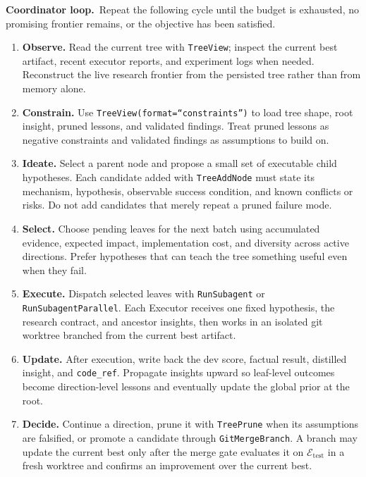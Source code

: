 \documentclass{llmxive}
\providecommand{\Eval}{\mathcal{E}}
\providecommand{\test}{\mathrm{test}}
\begin{document}
\begin{promptbox}[title=\textbf{Coordinator Prompt}]
\smallskip
\noindent\textbf{Coordinator loop.}~Repeat the following cycle until the
budget is exhausted, no promising frontier remains, or the objective has been
satisfied.
\begin{enumerate}[label=\textbf{\arabic*.},leftmargin=1.6em,itemsep=2pt,topsep=2pt]
  \item \textbf{Observe.} Read the current tree with \texttt{TreeView}; inspect
  the current best artifact, recent executor reports, and experiment logs when
  needed. Reconstruct the live research frontier from the persisted tree rather
  than from memory alone.
  \item \textbf{Constrain.} Use \texttt{TreeView(format=``constraints'')} to
  load tree shape, root insight, pruned lessons, and validated findings. Treat
  pruned lessons as negative constraints and validated findings as assumptions
  to build on.
  \item \textbf{Ideate.} Select a parent node and propose a small set of
  executable child hypotheses. Each candidate added with \texttt{TreeAddNode}
  must state its mechanism, hypothesis, observable success condition, and known
  conflicts or risks. Do not add candidates that merely repeat a pruned failure
  mode.
  \item \textbf{Select.} Choose pending leaves for the next batch using
  accumulated evidence, expected impact, implementation cost, and diversity
  across active directions. Prefer hypotheses that can teach the tree something
  useful even when they fail.
  \item \textbf{Execute.} Dispatch selected leaves with \texttt{RunSubagent} or
  \texttt{RunSubagentParallel}. Each Executor receives one fixed hypothesis,
  the research contract, and ancestor insights, then works in an isolated git
  worktree branched from the current best artifact.
  \item \textbf{Update.} After execution, write back the dev score, factual
  result, distilled insight, and \texttt{code\_ref}. Propagate insights upward
  so leaf-level outcomes become direction-level lessons and eventually update
  the global prior at the root.
  \item \textbf{Decide.} Continue a direction, prune it with \texttt{TreePrune}
  when its assumptions are falsified, or promote a candidate through
  \texttt{GitMergeBranch}. A branch may update the current best only after the
  merge gate evaluates it on $\Eval_\test$ in a fresh worktree and confirms an
  improvement over the current best.
\end{enumerate}


\end{promptbox}
\end{document}
